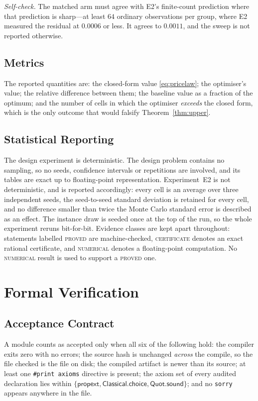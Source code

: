 \documentclass[conference]{IEEEtran}
\theoremstyle{definition}
\newcommand{\PROVED}{\textsc{proved}}
\newcommand{\CERT}{\textsc{certificate}}
\newcommand{\NUM}{\textsc{numerical}}
\begin{document}
\emph{Self-check.} The matched arm must agree with E2's finite-count prediction where that
prediction is sharp---at least $64$ ordinary observations per group, where E2 measured the
residual at $0.0006$ or less. It agrees to $0.0011$, and the sweep is not reported otherwise.

\subsection{Metrics}

The reported quantities are: the closed-form value \eqref{eq:pricelaw}; the optimiser's
value; the relative difference between them; the baseline value as a fraction of the
optimum; and the number of cells in which the optimiser \emph{exceeds} the closed form,
which is the only outcome that would falsify Theorem~\ref{thm:upper}.

\subsection{Statistical Reporting}

The design experiment is deterministic. The design problem contains no sampling, so no seeds,
confidence intervals or repetitions are involved, and its tables are exact up to
floating-point representation. Experiment~E2 is not deterministic, and is reported
accordingly: every cell is an average over three independent seeds, the seed-to-seed standard
deviation is retained for every cell, and no difference smaller than twice the Monte Carlo
standard error is described as an effect. The instance draw is seeded once at the top of the
run, so the whole experiment reruns bit-for-bit. Evidence classes are kept apart throughout: statements
labelled \PROVED{} are machine-checked, \CERT{} denotes an exact rational certificate, and
\NUM{} denotes a floating-point computation. No \NUM{} result is used to support a
\PROVED{} one.

\section{Formal Verification}
\label{sec:verification}

\subsection{Acceptance Contract}

A module counts as accepted only when all six of the following hold: the compiler exits zero
with no errors; the source hash is unchanged \emph{across} the compile, so the file checked is
the file on disk; the compiled artifact is newer than its source; at least one
\texttt{\#print axioms} directive is present; the axiom set of every audited declaration lies
within $\{\textsf{propext},\textsf{Classical.choice},\textsf{Quot.sound}\}$; and no
\texttt{sorry} appears anywhere in the file.
\end{document}
